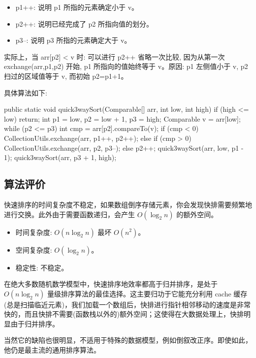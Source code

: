 \begin{itemize}
  \item p1++: 说明 p1 所指的元素确定小于 v。
  \item p2++: 说明已经完成了 p2 所指向值的划分。
  \item p3--: 说明 p3 所指的元素确定大于 v。
\end{itemize}

实际上，当 arr[p2] < v 时: 可以进行 p2++ 省略一次比较, 因为从第一次 exchange(arr,p1,p2) 开始, p1 所指向的值始终等于 v。原因: p1 左侧值小于 v, p2 扫过的区域值等于 v, 而初始 p2=p1+1。

具体算法如下:

\begin{Java}
public static void quick3waySort(Comparable[] arr, int low, int high) {
    if (high <= low)
        return;
    int p1 = low, p2 = low + 1, p3 = high;
    Comparable v = arr[low];
    while (p2 <= p3) {
        int cmp = arr[p2].compareTo(v);
        if (cmp < 0)
            CollectionUtils.exchange(arr, p1++, p2++);
        else if (cmp > 0)
            CollectionUtils.exchange(arr, p2, p3--);
        else
            p2++;
    }
    quick3waySort(arr, low, p1 - 1);
    quick3waySort(arr, p3 + 1, high);
}
\end{Java}

\subsection{算法评价}

快速排序的时间复杂度不稳定，如果数组倒序存储元素，你会发现快排需要频繁地进行交换。此外由于需要函数递归，会产生 $O(\log_2 n)$ 的额外空间。

\begin{itemize}
  \item 时间复杂度: $O(n\log_2 n)$ 最坏 $O(n^2)$。
  \item 空间复杂度: $O(\log_2 n)$。
  \item 稳定性: 不稳定。
\end{itemize}

在绝大多数随机数学模型中，快速排序地效率都高于归并排序，是处于 $O(n\log_2 n)$ 量级排序算法的最佳选择。这主要归功于它能充分利用 cache 缓存(总是扫描临近元素)，我们加载一个数组后，快排进行指针相邻移动的速度是非常快的，而且快排不需要(函数栈以外的)额外空间；这使得在大数据处理上，快排明显由于归并排序。

当然它的缺陷也很明显，不适用于特殊的数据模型，例如倒叙改正序。即使如此，他仍是最主流的通用排序算法。

\newpage
